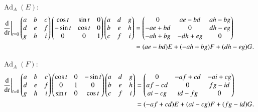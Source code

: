 \documentclass[a4paper, 12pt]{article}
\theoremstyle{Mydefinition}
\theoremstyle{Mytheorem}
\DeclareMathOperator{\Ad}{Ad}
\begin{document}
\begin{enumerate}
$\Ad_A(E)$:
\begin{equation*}
\begin{split}
    \left.\dv{t}\right|_{t=0}\begin{pmatrix}
        a & b & c\\
        d & e & f\\
        g & h & i
    \end{pmatrix}
    \begin{pmatrix}
        \cos t & \sin t & 0\\
        -\sin t & \cos t & 0\\
        0 & 0 & 1
    \end{pmatrix}
    \begin{pmatrix}
        a & d & g\\
        b & e & h\\
        c & f & i
    \end{pmatrix}&=\begin{pmatrix}
        0 & ae-bd & ah-bg\\
        -ae+bd & 0 & dh-eg\\
        -ah+bg & -dh+eg & 0
    \end{pmatrix}\\
    &=(ae-bd)E+(-ah+bg)F+(dh-eg)G.
\end{split}
\end{equation*}

$\Ad_A(F)$:
\begin{equation*}
\begin{split}
    \left.\dv{t}\right|_{t=0}\begin{pmatrix}
        a & b & c\\
        d & e & f\\
        g & h & i
    \end{pmatrix}
    \begin{pmatrix}
        \cos t & 0 & -\sin t\\
        0 & 1 & 0\\
        \sin t & 0 & \cos t
    \end{pmatrix}
    \begin{pmatrix}
        a & d & g\\
        b & e & h\\
        c & f & i
    \end{pmatrix}&=\begin{pmatrix}
        0 & -af+cd & -ai+cg\\
        af-cd & 0 & fg-id\\
        ai-cg & id-fg & 0
    \end{pmatrix}\\
    &=(-af+cd)E+(ai-cg)F+(fg-id)G.
\end{split}
\end{equation*}


\end{enumerate}
\end{document}
